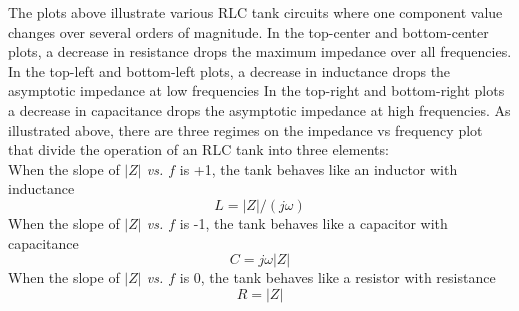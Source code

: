 The plots above illustrate various RLC tank circuits where one component value changes over several orders of magnitude.
In the top-center and bottom-center plots, a decrease in resistance drops the maximum impedance over all frequencies.
In the top-left and bottom-left plots, a decrease in inductance drops the asymptotic impedance at low frequencies
In the top-right and bottom-right plots a decrease in capacitance drops the asymptotic impedance at high frequencies.
As illustrated above, there are three regimes on the impedance vs frequency plot that divide the operation of an RLC tank into three elements:\\
When the slope of \emph{$|Z|$ vs. $f$} is +1, the tank behaves like an inductor with inductance
\begin{equation*}
L=|Z|/(j\omega)
\end{equation*}
When the slope of \emph{$|Z|$ vs. $f$} is -1, the tank behaves like a capacitor with capacitance
\begin{equation*}
C=j\omega |Z|
\end{equation*}
When the slope of \emph{$|Z|$ vs. $f$} is 0, the tank behaves like a resistor with resistance
\begin{equation*}
R=|Z|
\end{equation*}

